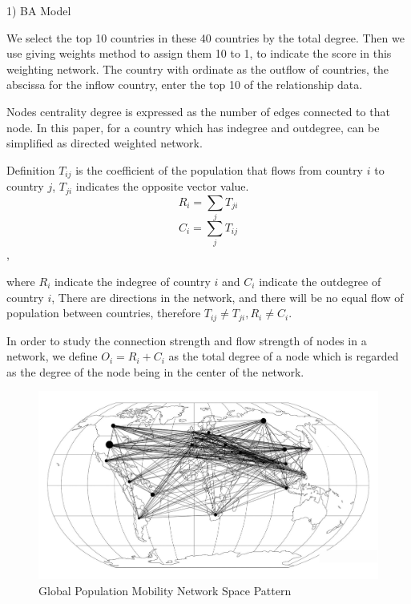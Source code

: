     1) BA Model

   We select the top 10 countries in these 40 countries by the total degree. Then we use giving weights method to assign them 10 to 1, to indicate the score in this weighting network. The country with ordinate as the outflow of countries, the abscissa for the inflow country, enter the top 10 of the relationship data.

Nodes centrality degree is expressed as the number of edges connected to that node. In this paper, for a country which has indegree and outdegree, can be simplified as directed weighted network.

Definition ${{T}_{ij}}$ is the coefficient of the population that flows from country $i$ to country $j$, ${{T}_{ji}}$ indicates the opposite vector value.
\[{R_i} = \sum\limits_j {{T_{ji}}} \]
\[{C_i} = \sum\limits_j {{T_{ij}}} \],

 where ${{R}_{i}}$ indicate the indegree of country $i$ and ${{C}_{i}}$ indicate the outdegree of country $i$, There are directions in the network, and there will be no equal flow of population between countries, therefore ${{T}_{ij}}\ne {{T}_{ji}},{{R}_{i}}\ne {{C}_{i}}$.

In order to study the connection strength and flow strength of nodes in a network, we define ${{O}_{i}}={{R}_{i}}+{{C}_{i}}$ as the total degree of a node which is regarded as the degree of the node being in the center of the network.

    \begin{figure}[H]                                           %
        \centering
        \includegraphics[width = .8\textwidth]{yiduixian.jpg}        %
        \caption{Global Population Mobility Network Space Pattern}                            %
        \label{yiduixian}                                           %
    \end{figure}

